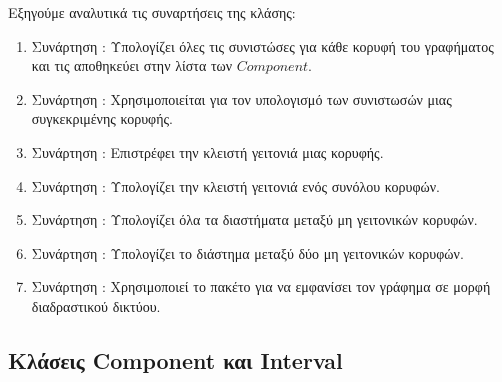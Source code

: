 

Εξηγούμε αναλυτικά τις συναρτήσεις της κλάσης:

\begin{enumerate}
	\item Συνάρτηση : Υπολογίζει όλες τις συνιστώσες για κάθε κορυφή του γραφήματος και τις αποθηκεύει στην λίστα των $Component$.
	
	\item Συνάρτηση : Χρησιμοποιείται για τον υπολογισμό των συνιστωσών μιας συγκεκριμένης κορυφής.
	
	\item Συνάρτηση : Επιστρέφει την κλειστή γειτονιά μιας κορυφής.
	
	\item Συνάρτηση : Υπολογίζει την κλειστή γειτονιά ενός συνόλου κορυφών.
	
	\item Συνάρτηση : Υπολογίζει όλα τα διαστήματα μεταξύ μη γειτονικών κορυφών.
	
	\item Συνάρτηση : Υπολογίζει το διάστημα μεταξύ δύο μη γειτονικών κορυφών.
	
	\item Συνάρτηση : Χρησιμοποιεί το πακέτο  για να εμφανίσει τον γράφημα σε μορφή διαδραστικού δικτύου.
	
\end{enumerate}

\subsection{Κλάσεις Component και Interval}




